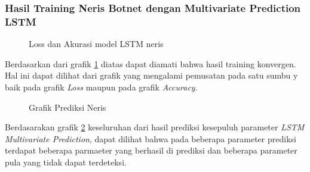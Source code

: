 \documentclass[./skripsi.tex]{subfiles}
\begin{document}
\subsubsection{Hasil Training Neris Botnet dengan Multivariate Prediction LSTM}

\begin{figure}[H]
    \centering
    \caption{Loss dan Akurasi model LSTM neris}
    \label{fig:lstmm_neris}
\end{figure}

\par Berdasarkan dari grafik \ref{fig:lstmm_neris} diatas dapat diamati bahwa hasil training konvergen. Hal ini dapat dilihat dari grafik yang mengalami pemusatan pada satu sumbu y baik pada grafik \textit{Loss} maupun pada grafik \textit{Accuracy}.

\begin{figure}[H]
    \centering
    \caption{Grafik Prediksi Neris}
    \label{fig:lstmm_neris_pred}
\end{figure}

\par Berdasarakan grafik \ref{fig:lstmm_neris_pred} keseluruhan dari hasil prediksi kesepuluh parameter \textit{LSTM Multivariate Prediction}, dapat dilihat bahwa pada beberapa parameter prediksi terdapat beberapa parmaeter yang berhasil di prediksi dan beberapa parameter pula yang tidak dapat terdeteksi.
\end{document}
